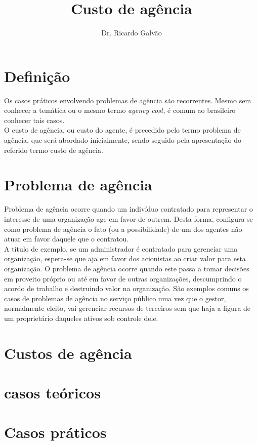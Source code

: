 \documentclass[jou,apacite]{apa6}
\title{Custo de agência}
\author{Dr. Ricardo Galvão}
\affiliation{https://github.com/rcgalvao/financas}
\begin{document}
\maketitle    
                        
\section{Definição}
Os casos práticos envolvendo problemas de agência são recorrentes. Mesmo sem conhecer a temática ou o mesmo termo \textit{agency cost}, é comum ao brasileiro conhecer tais casos. \\
O custo de agência, ou custo do agente, é precedido pelo termo problema de agência, que será abordado inicialmente, sendo seguido pela apresentação do referido termo custo de agência.\\


\section{Problema de agência}
Problema de agência ocorre quando um indivíduo contratado para representar o interesse de uma organização age em favor de outrem. Desta forma, configura-se como problema de agência o fato (ou a possibilidade) de um dos agentes não atuar em favor daquele que o contratou.  \\
A título de exemplo, se um administrador é contratado para gerenciar uma organização, espera-se que aja em favor dos acionistas ao criar valor para esta organização. O problema de agência ocorre quando este passa a tomar decisões em proveito próprio ou até em favor de outras organizações, descumprindo o acordo de trabalho e destruindo valor na organização. São exemplos comuns os casos de problemas de agência no serviço público uma vez que o gestor, normalmente eleito, vai gerenciar recursos de terceiros sem que haja a figura de um proprietário daqueles ativos sob controle dele. 

\section{Custos de agência}

\section{casos teóricos}

\section{Casos práticos}
\end{document}
